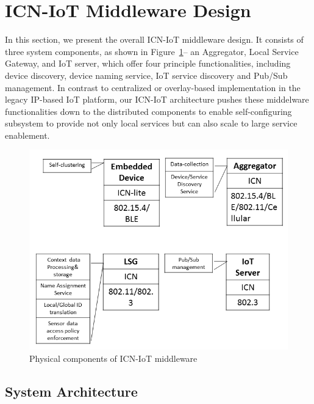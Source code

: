 \section{ICN-IoT Middleware Design}
In this section, we present the overall ICN-IoT middleware design. It consists of three system components, as shown in Figure~\ref{fig:phy}-- an Aggregator, Local Service Gateway, and IoT server, which offer four principle functionalities, including device discovery, device naming service, IoT service discovery and Pub/Sub management.
In contrast to centralized or overlay-based implementation in the legacy IP-based IoT platform, our ICN-IoT architecture pushes these middelware functionalities down to the distributed components to enable self-configuring subsystem to provide not only local services but can also scale to large service enablement.
\begin{figure}
\includegraphics[width=\columnwidth]{figure/physical_comp.png}
\caption{\label{fig:phy}Physical components of ICN-IoT middleware}
\end{figure}

\subsection{System Architecture}\label{sec:physical}

